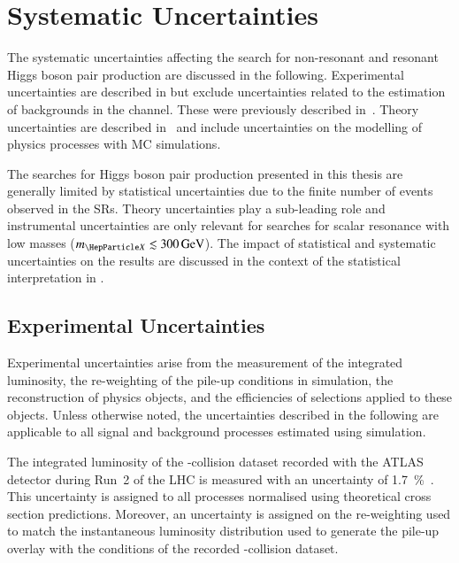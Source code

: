 \section{Systematic Uncertainties}%
\label{sec:uncertainties}

The systematic uncertainties affecting the search for non-resonant and resonant
Higgs boson pair production are discussed in the following. Experimental
uncertainties are described in  but exclude
uncertainties related to the estimation of \faketauhadvis backgrounds in the
\hadhad channel. These were previously described
in~. Theory uncertainties are
described in~ and include uncertainties on the
modelling of physics processes with MC simulations.

The searches for Higgs boson pair production presented in this thesis are
generally limited by statistical uncertainties due to the finite number of
events observed in the SRs. Theory uncertainties play a sub-leading role and
instrumental uncertainties are only relevant for searches for scalar resonance
with low masses ($\mX \lesssim \SI{300}{\GeV}$). The impact of statistical and
systematic uncertainties on the results are discussed in the context of the
statistical interpretation in .


\subsection{Experimental Uncertainties}%
\label{sec:experimental_uncertainties}

Experimental uncertainties arise from the measurement of the integrated
luminosity, the re-weighting of the pile-up conditions in simulation, the
reconstruction of physics objects, and the efficiencies of selections applied to
these objects. Unless otherwise noted, the uncertainties described in the
following are applicable to all signal and background processes estimated using
simulation.

The integrated luminosity of the \pp-collision dataset recorded with the ATLAS
detector during Run~2 of the LHC is measured with an uncertainty of
\SI{1.7}{\percent}~\cite{ATLAS-CONF-2019-021}. This uncertainty is assigned to
all processes normalised using theoretical cross section predictions. Moreover,
an uncertainty is assigned on the re-weighting used to match the instantaneous
luminosity distribution used to generate the pile-up overlay with the conditions
of the recorded \pp-collision dataset.

